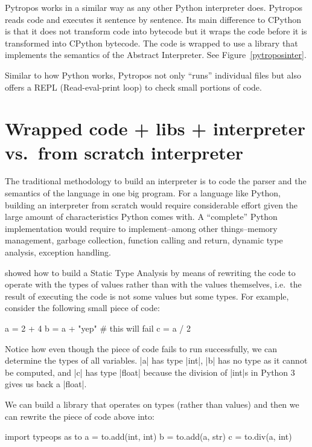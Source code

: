 Pytropos works in a similar way as any other Python interpreter does. Pytropos reads code
and executes it sentence by sentence. Its main difference to CPython is that it does not
transform code into bytecode but it wraps the code before it is transformed into CPython
bytecode. The code is wrapped to use a library that implements the semantics of the
Abstract Interpreter. See Figure~\ref{pytroposinter}.

Similar to how Python works, Pytropos not only \enquote{runs} individual files but also
offers a REPL (Read-eval-print loop) to check small portions of code.

\section{Wrapped code + libs + interpreter vs.~from scratch interpreter}%
\label{wrapped-code-libs-interpreter-vs.from-scratch-interpreter}

The traditional methodology to build an interpreter is to code the parser and the
semantics of the language in one big program. For a language like Python, building an
interpreter from scratch would require considerable effort given the large amount of
characteristics Python comes with. A \enquote{complete} Python implementation would
require to implement--among other things--memory management, garbage collection, function
calling and return, dynamic type analysis, exception handling.

\textcite{ortin_towards_2015} showed how to build a Static Type Analysis by means of
rewriting the code to operate with the types of values rather than with the values
themselves, i.e.~the result of executing the code is not some values but some types. For
example, consider the following small piece of code:

\begin{pythoncode}
a = 2 + 4
b = a + "yep"  # this will fail
c = a / 2
\end{pythoncode}

Notice how even though the piece of code fails to run successfully,
we can determine the types of all variables. \pycode|a| has type
\pycode|int|, \pycode|b| has no type as it cannot be
computed, and \pycode|c| has type \pycode|float| because the
division of \pycode|int|s in Python 3 gives us back a \pycode|float|.

We can build a library that operates on types (rather than values) and
then we can rewrite the piece of code above into:

\begin{pythoncode}
import typeops as to
a = to.add(int, int)
b = to.add(a, str)
c = to.div(a, int)
\end{pythoncode}

